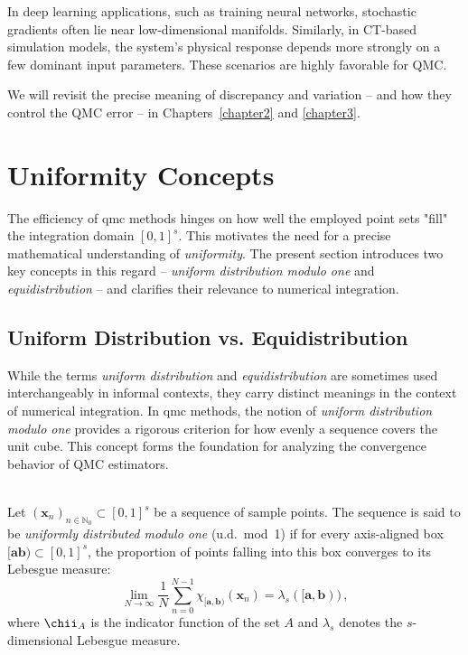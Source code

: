 \begin{example}
In deep learning applications, such as training neural networks, stochastic
gradients often lie near low-dimensional manifolds. Similarly, in CT-based
simulation models, the system's physical response depends more strongly on a few
dominant input parameters. These scenarios are highly favorable for QMC.
\end{example}

We will revisit the precise meaning of discrepancy and variation -- and how they
control the QMC error -- in Chapters~\ref{chapter2} and \ref{chapter3}.


\section{Uniformity Concepts}
\label{sec:uniformity-concepts}

The efficiency of \ac{qmc} methods hinges on how well the employed point sets
"fill" the integration domain $[0,1]^s$. This motivates the need for a precise
mathematical understanding of \emph{uniformity}. The present section introduces
two key concepts in this regard -- \emph{uniform distribution modulo one} and
\emph{equidistribution} -- and clarifies their relevance to numerical
integration.

\subsection{Uniform Distribution vs. Equidistribution}

While the terms \emph{uniform distribution} and \emph{equidistribution} are
sometimes used interchangeably in informal contexts, they carry distinct
meanings in the context of numerical integration. In \ac{qmc} methods, the
notion of \emph{uniform distribution modulo one} provides a rigorous criterion
for how evenly a sequence covers the unit cube. This concept forms the
foundation for analyzing the convergence behavior of QMC estimators.

\begin{definition} \ \\
Let $(\boldsymbol{x}_n)_{n \in \mathbb{N}_0} \subset [0,1]^s$ be a sequence of
sample points. The sequence is said to be \emph{uniformly distributed modulo
one} (u.d.\ mod~1) if for every axis-aligned box $[\boldsymbol{a}
\boldsymbol{b}) \subset [0,1]^s$, the proportion of points falling into this box
converges to its Lebesgue measure:
\begin{equation*}
    \lim_{N \to \infty} \frac{1}{N} \sum_{n=0}^{N-1} \chi_{[\boldsymbol{a}, \boldsymbol{b})}(\boldsymbol{x}_n)
    = \lambda_s([\boldsymbol{a}, \boldsymbol{b})) \,,
\end{equation*}
where $\chii_A$ is the indicator function of the set $A$ and $\lambda_s$ denotes
the $s$-dimensional Lebesgue measure.
\end{definition}

